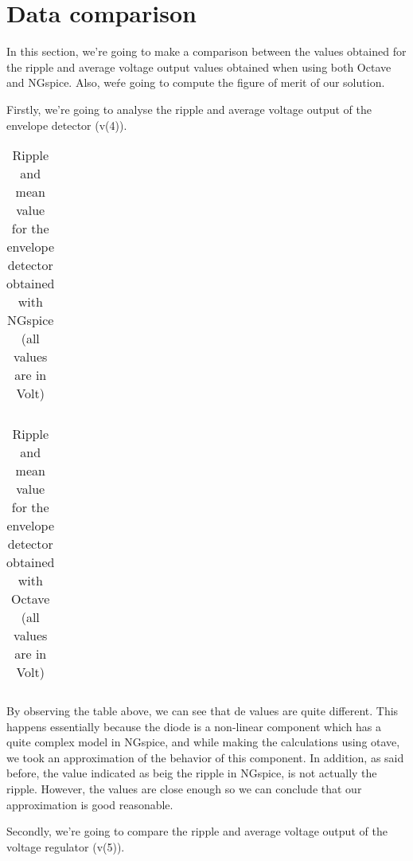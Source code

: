 \section{Data comparison}
\label{sec:comparison}

\par In this section, we're going to make a comparison between the values obtained for the ripple and average voltage output values obtained when using both Octave and NGspice. Also, weŕe going to compute the figure of merit of our solution.
\par Firstly, we're going to analyse the ripple and average voltage output of the envelope detector (v(4)).

\vspace{5mm}
\begin{table}[h!]
\centering
\begin{tabularx}{0.9\textwidth} {
  | >{\raggedright\arraybackslash}X
  | >{\raggedleft\arraybackslash}X | }
 \hline

\end{tabularx}
\caption{\label{tab:Table 6} Ripple and mean value for the envelope detector obtained with NGspice (all values are in Volt)}
\end{table}
\vspace{5mm}

\begin{table}[h!]
\centering
\begin{tabularx}{0.9\textwidth} {
  | >{\raggedright\arraybackslash}X
  | >{\raggedleft\arraybackslash}X | }
 \hline

\end{tabularx}
\caption{\label{tab:Table 7} Ripple and mean value for the envelope detector obtained with Octave (all values are in Volt)}
\end{table}
\vspace{5mm}

\par By observing the table above, we can see that de values are quite different. This happens essentially because the diode is a non-linear component which has a quite complex model in NGspice, and while making the calculations using otave, we took an approximation of the behavior of this component. In addition, as said before, the value indicated as beig the ripple in NGspice, is not actually the ripple. However, the values are close enough so we can conclude that our approximation is good reasonable.
\par Secondly, we're going to compare the ripple and average voltage output of the voltage regulator (v(5)).

